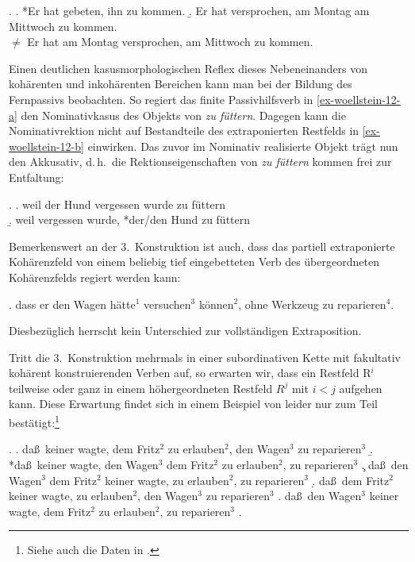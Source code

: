 \ex. \label{ex-3konstr-2}
\a. *Er hat gebeten, ihn zu kommen.
\b. Er hat versprochen, am Montag am Mittwoch zu kommen. \\
$\neq$ Er hat am Montag versprochen, am Mittwoch zu kommen.     

Einen deutlichen kasusmorphologischen Reflex dieses Nebeneinanders von kohärenten und inkohärenten Bereichen kann man bei der Bildung des Fernpassivs beobachten. So regiert das finite Passivhilfsverb in \ref{ex-woellstein-12-a} den Nominativkasus des Objekts von {\it zu füttern}. Dagegen kann die Nominativrektion nicht auf Bestandteile des extraponierten Restfelds in \ref{ex-woellstein-12-b} einwirken. Das zuvor im Nominativ realisierte Objekt trägt nun den Akkusativ, d.\,h.\ die Rektionseigenschaften von {\it zu füttern} kommen frei zur Entfaltung:      

\ex. 
\a. weil der Hund vergessen wurde zu füttern\\
\citep[(12c)]{Woellstein:01}\label{ex-woellstein-12-a} 
\b. weil vergessen wurde, *der/den Hund zu füttern\label{ex-woellstein-12-b}
  
Bemerkenswert an der 3.~Konstruktion ist auch, dass das partiell extraponierte Kohärenzfeld von einem beliebig tief eingebetteten Verb des übergeordneten Kohärenzfelds regiert werden kann:

\ex. dass er den Wagen hätte$^1$ versuchen$^3$ können$^2$, ohne Werkzeug zu repa\-rie\-ren$^4$.

Diesbezüglich herrscht kein Unterschied zur vollständigen Extraposition.

Tritt die 3.~Konstruktion mehrmals in einer subordinativen Kette mit fakultativ kohärent konstruierenden Verben auf, so erwarten wir, dass ein Restfeld R$^i$ teilweise oder ganz in einem höhergeordneten Restfeld $R^j$ mit $i<j$ aufgehen kann. Diese Erwartung findet sich in einem Beispiel von \cite{Sabel:95} leider nur zum Teil bestätigt:\footnote{Siehe auch die Daten in \citet[18]{Rambow:94}.}

{\setlength{\Exlabelsep}{0.8em} \setlength{\SubExleftmargin}{1.7em}
\ex.
\a. da\ss\ keiner wagte, dem Fritz$^2$ zu erlauben$^2$, den Wagen$^3$ zu reparie\-ren$^3$
\b. *da\ss\ keiner wagte, den Wagen$^3$ dem Fritz$^2$ zu erlauben$^2$, zu reparie\-ren$^3$\label{ex-sabel-28-b}
\c. da\ss\ den Wagen$^3$ dem Fritz$^2$ keiner wagte, zu erlauben$^2$, zu reparie\-ren$^3$
\d. da\ss\ dem Fritz$^2$ keiner wagte, zu erlauben$^2$, den Wagen$^3$ zu reparie\-ren$^3$
\e. da\ss\ den Wagen$^3$ keiner wagte, dem Fritz$^2$ zu erlauben$^2$, zu reparie\-ren$^3$
\z. \citep[(28)]{Sabel:95}

}

